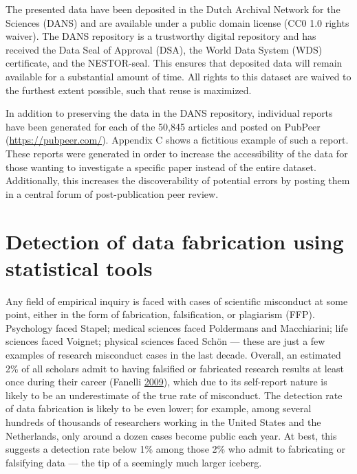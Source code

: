\documentclass[a5paper]{book}
\begin{document}
The presented data have been deposited in the Dutch Archival Network for
the Sciences (DANS) and are available under a public domain license (CC0
1.0 rights waiver). The DANS repository is a trustworthy digital
repository and has received the Data Seal of Approval (DSA), the World
Data System (WDS) certificate, and the NESTOR-seal. This ensures that
deposited data will remain available for a substantial amount of time.
All rights to this dataset are waived to the furthest extent possible,
such that reuse is maximized.

In addition to preserving the data in the DANS repository, individual
reports have been generated for each of the 50,845 articles and posted
on PubPeer (\url{https://pubpeer.com/}). Appendix C shows a fictitious
example of such a report. These reports were generated in order to
increase the accessibility of the data for those wanting to investigate
a specific paper instead of the entire dataset. Additionally, this
increases the discoverability of potential errors by posting them in a
central forum of post-publication peer review.

\chapter{Detection of data fabrication using statistical
tools}\label{detection-of-data-fabrication-using-statistical-tools}

Any field of empirical inquiry is faced with cases of scientific
misconduct at some point, either in the form of fabrication,
falsification, or plagiarism (FFP). Psychology faced Stapel; medical
sciences faced Poldermans and Macchiarini; life sciences faced Voignet;
physical sciences faced Schön --- these are just a few examples of
research misconduct cases in the last decade. Overall, an estimated 2\%
of all scholars admit to having falsified or fabricated research results
at least once during their career (Fanelli
\protect\hyperlink{ref-doi:10.1371ux2fjournal.pone.0005738}{2009}),
which due to its self-report nature is likely to be an underestimate of
the true rate of misconduct. The detection rate of data fabrication is
likely to be even lower; for example, among several hundreds of
thousands of researchers working in the United States and the
Netherlands, only around a dozen cases become public each year. At best,
this suggests a detection rate below 1\% among those 2\% who admit to
fabricating or falsifying data --- the tip of a seemingly much larger
iceberg.
\end{document}
